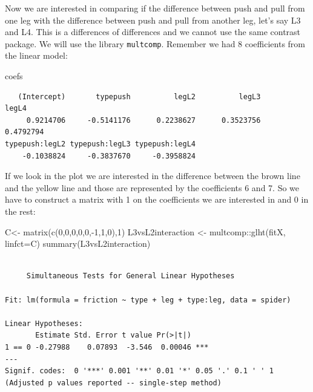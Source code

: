 \documentclass[
  letterpaper,
  DIV=11,
  numbers=noendperiod]{scrartcl}
\newenvironment{Shaded}{\begin{snugshade}}{\end{snugshade}}
\newcommand{\AttributeTok}[1]{\textcolor[rgb]{0.40,0.45,0.13}{#1}}
\newcommand{\DecValTok}[1]{\textcolor[rgb]{0.68,0.00,0.00}{#1}}
\newcommand{\FunctionTok}[1]{\textcolor[rgb]{0.28,0.35,0.67}{#1}}
\newcommand{\NormalTok}[1]{\textcolor[rgb]{0.00,0.23,0.31}{#1}}
\newcommand{\OtherTok}[1]{\textcolor[rgb]{0.00,0.23,0.31}{#1}}
\newcommand{\SpecialCharTok}[1]{\textcolor[rgb]{0.37,0.37,0.37}{#1}}
\begin{document}
Now we are interested in comparing if the difference between push and
pull from one leg with the difference between push and pull from another
leg, let's say L3 and L4. This is a differences of differences and we
cannot use the same contrast package. We will use the library
\texttt{multcomp}. Remember we had 8 coefficients from the linear model:

\begin{Shaded}
\begin{Highlighting}[]
\NormalTok{coefs}
\end{Highlighting}
\end{Shaded}

\begin{verbatim}
   (Intercept)       typepush          legL2          legL3          legL4 
     0.9214706     -0.5141176      0.2238627      0.3523756      0.4792794 
typepush:legL2 typepush:legL3 typepush:legL4 
    -0.1038824     -0.3837670     -0.3958824 
\end{verbatim}

If we look in the plot we are interested in the difference between the
brown line and the yellow line and those are represented by the
coefficients 6 and 7. So we have to construct a matrix with 1 on the
coefficients we are interested in and 0 in the rest:

\begin{Shaded}
\begin{Highlighting}[]
\NormalTok{C}\OtherTok{\textless{}{-}} \FunctionTok{matrix}\NormalTok{(}\FunctionTok{c}\NormalTok{(}\DecValTok{0}\NormalTok{,}\DecValTok{0}\NormalTok{,}\DecValTok{0}\NormalTok{,}\DecValTok{0}\NormalTok{,}\DecValTok{0}\NormalTok{,}\SpecialCharTok{{-}}\DecValTok{1}\NormalTok{,}\DecValTok{1}\NormalTok{,}\DecValTok{0}\NormalTok{),}\DecValTok{1}\NormalTok{)}
\NormalTok{L3vsL2interaction }\OtherTok{\textless{}{-}}\NormalTok{ multcomp}\SpecialCharTok{::}\FunctionTok{glht}\NormalTok{(fitX, }\AttributeTok{linfct=}\NormalTok{C)}
\FunctionTok{summary}\NormalTok{(L3vsL2interaction)}
\end{Highlighting}
\end{Shaded}

\begin{verbatim}

     Simultaneous Tests for General Linear Hypotheses

Fit: lm(formula = friction ~ type + leg + type:leg, data = spider)

Linear Hypotheses:
       Estimate Std. Error t value Pr(>|t|)    
1 == 0 -0.27988    0.07893  -3.546  0.00046 ***
---
Signif. codes:  0 '***' 0.001 '**' 0.01 '*' 0.05 '.' 0.1 ' ' 1
(Adjusted p values reported -- single-step method)
\end{verbatim}
\end{document}
